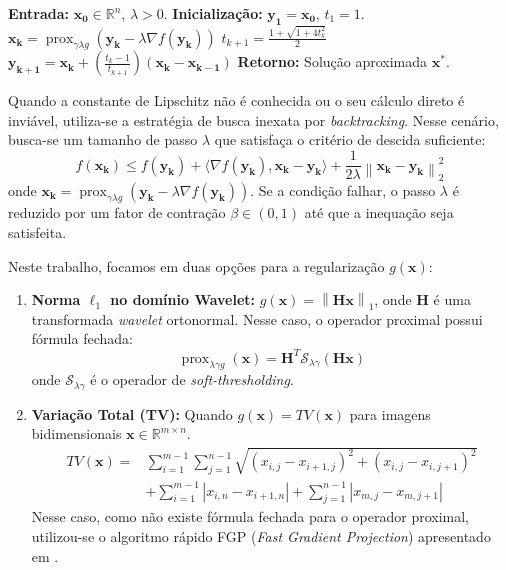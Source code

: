 \documentclass[12pt]{article}
\DeclareMathOperator{\prox}{prox}
\newcommand{\norm}[1]{\left\lVert#1\right\rVert}
\begin{document}
\begin{algorithm}[H]
\caption{FISTA}
\begin{algorithmic}[1]
\State \textbf{Entrada:} $\mathbf{x_0} \in \mathbb{R}^n$, $\lambda > 0$.
\State \textbf{Inicialização:} $\mathbf{y_1} = \mathbf{x_0}$, $t_1 = 1$.
    \State $\mathbf{x_k} = \operatorname{prox}_{\gamma \lambda g} ( \mathbf{y_k} - \lambda \nabla f( \mathbf{y_k} ) )$
    \State $t_{k+1} = \frac{1 + \sqrt{ 1 + 4 t_k^2 }}{2}$
    \State $\mathbf{y_{k+1}} = \mathbf{x_k} + \left( \frac{t_k - 1}{t_{k+1}} \right) ( \mathbf{x_k} - \mathbf{x_{k-1}} )$
\EndFor
\State \textbf{Retorno:} Solução aproximada $\mathbf{x^*}$.
\end{algorithmic}
\end{algorithm}

Quando a constante de Lipschitz não é conhecida ou o seu cálculo direto é inviável, utiliza-se a estratégia de busca inexata por \textit{backtracking}. Nesse cenário, busca-se um tamanho de passo $\lambda$ que satisfaça o critério de descida suficiente:
\[
f(\mathbf{x_k}) \leq f(\mathbf{y_k}) + \langle \nabla f(\mathbf{y_k}), \mathbf{x_k} - \mathbf{y_k} \rangle + \frac{1}{2\lambda} \norm{\mathbf{x_k} - \mathbf{y_k}}_2^2
\]
onde $\mathbf{x_k} = \operatorname{prox}_{\gamma \lambda g} ( \mathbf{y_k} - \lambda \nabla f( \mathbf{y_k} ) )$. Se a condição falhar, o passo $\lambda$ é reduzido por um fator de contração $\beta \in (0, 1)$ até que a inequação seja satisfeita.

Neste trabalho, focamos em duas opções para a regularização $g(\mathbf{x})$:
\begin{enumerate}
    \item \textbf{Norma $\ell_1$ no domínio Wavelet:} $g(\mathbf{x}) = \norm{\mathbf{Hx}}_1$, onde $\mathbf{H}$ é uma transformada \textit{wavelet} ortonormal. Nesse caso, o operador proximal possui fórmula fechada:
    \[
    \prox_{\lambda \gamma g}(\mathbf{x}) = \mathbf{H}^T \mathcal{S}_{\lambda \gamma}(\mathbf{Hx})
    \]
    onde $\mathcal{S}_{\lambda \gamma}$ é o operador de \textit{soft-thresholding}.
    \item \textbf{Variação Total (TV):} Quando $g(\mathbf{x}) = TV(\mathbf{x})$ para imagens bidimensionais $\mathbf{x} \in \mathbb{R}^{m \times n}$.
    \[
    \begin{aligned}
    TV(\mathbf{x}) = 
    & \sum_{i=1}^{m-1} \sum_{j=1}^{n-1} 
    \sqrt{(x_{i,j} - x_{i+1,j})^2 + (x_{i,j} - x_{i,j+1})^2} \\
    & + \sum_{i=1}^{m-1} |x_{i,n} - x_{i+1,n}| + \sum_{j=1}^{n-1} |x_{m,j} - x_{m,j+1}|
    \end{aligned}
    \]
    Nesse caso, como não existe fórmula fechada para o operador proximal, utilizou-se o algoritmo rápido FGP (\textit{Fast Gradient Projection}) apresentado em \cite{bet09b}.
\end{enumerate}
\end{document}

